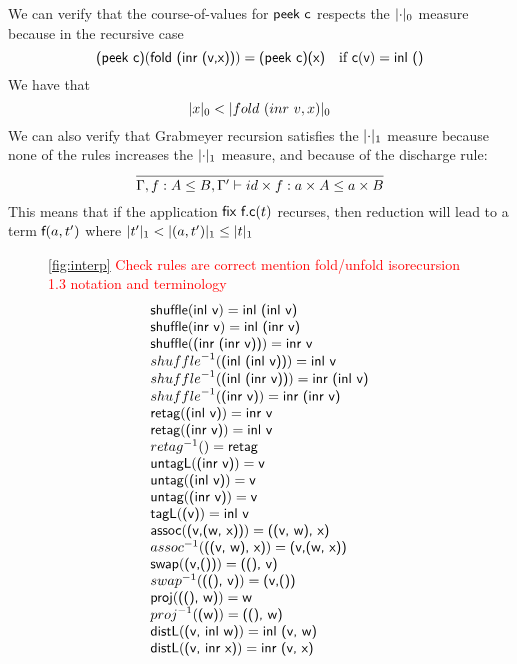 \documentclass[a4paper,UKenglish,cleveref, autoref, thm-restate]{lipics-v2021}
\newcommand\mycomment[1]{\textcolor{red}{#1}}
\begin{document}
We can verify that the course-of-values for $\textsf{peek c}$ respects the $\zerom{\cdot}$ measure because in the recursive case \[\textsf{(peek c)}(\textsf{fold (inr (v,x))})=\textsf{(peek c)(x)}\quad \text{if }\textsf{c}(\textsf{v})=\textsf{inl ()}\]
We have that 
\[ \zerom{x} < \zerom{fold~ (inr~ v,x)}\]
We can also verify that Grabmeyer recursion satisfies the $\onem{\cdot}$ measure because none of the rules increases the $\onem{\cdot}$ measure, and because of the discharge rule:
\[\infer{\contains{\Gamma, f : A \leq B, \Gamma'}{id \times f}{a \times A}{a \times B}}{}\]
This means that if the application $\textsf{fix f.c}(t)$ recurses, then reduction will lead to a term $\textsf{f}(a,t')$ where $\onem{t'} < \onem{(a,t')}\leq \onem{t}$
\begin{figure} \ref{fig:interp}
\mycomment{Check rules are correct}
\mycomment{mention fold/unfold isorecursion 1.3 notation and terminology}
  \centering
  \begin{displaymath}
    \begin{array}{l}
\irule{shuffle}{inl v}{inl (inl v)}\\
\irule{shuffle}{inr v}{inl (inr v)}\\
\irule{shuffle}{(inr (inr v))}{inr v}\\
\iruleinv{shuffle}{(inl (inl v))}{inl v}\\
\iruleinv{shuffle}{(inl (inr v))}{inr (inl v)}\\
\iruleinv{shuffle}{(inr v)}{inr (inr v)}\\
\irule{retag}{(inl v)}{inr v}\\
\irule{retag}{(inr v)}{inl v}\\
\iruleinv{retag}{}{retag}\\
\irule{untagL}{(inr v)}{v}\\
\irule{untag}{(inl v)}{v}\\
\irule{untag}{(inr v)}{v}\\
\irule{tagL}{(v)}{inl v}\\ 
\irule{assoc}{(v,(w, x))}{((v, w), x)}\\
\iruleinv{assoc}{((v, w), x)}{(v,(w, x))}\\
\irule{swap}{(v,())}{((), v)}\\
\iruleinv{swap}{((), v)}{(v,())}\\
\irule{proj}{((), w)}{w}\\
\iruleinv{proj}{(w)}{((), w)}\\
\irule{distL}{(v, inl w)}{inl (v, w)}\\
\irule{distL}{(v, inr x)}{inr (v, x)}\\

\end{array}
\end{displaymath}
\end{figure}
\end{document}
